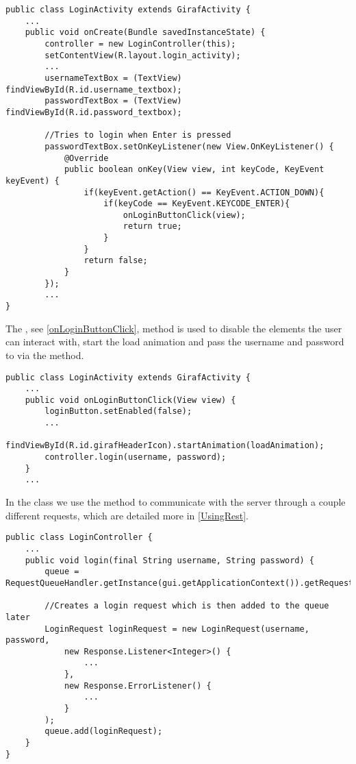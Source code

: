\begin{minipage}[H]{\linewidth}
\begin{lstlisting}[caption = ???, label = onCreate] 
public class LoginActivity extends GirafActivity {
	...
	public void onCreate(Bundle savedInstanceState) {
		controller = new LoginController(this);
    	setContentView(R.layout.login_activity);
		...
        usernameTextBox = (TextView) findViewById(R.id.username_textbox);
        passwordTextBox = (TextView) findViewById(R.id.password_textbox);
        
        //Tries to login when Enter is pressed
        passwordTextBox.setOnKeyListener(new View.OnKeyListener() {
            @Override
            public boolean onKey(View view, int keyCode, KeyEvent keyEvent) {
                if(keyEvent.getAction() == KeyEvent.ACTION_DOWN){
                    if(keyCode == KeyEvent.KEYCODE_ENTER){
                        onLoginButtonClick(view);
                        return true;
                    }
                }
                return false;
            }
        });
        ...
}
\end{lstlisting}
\end{minipage}

The , see \autoref{onLoginButtonClick}, method is used
to disable the elements the user can interact with, start the load animation and
pass the username and password to  via the 
method.\nl

\begin{minipage}[H]{\linewidth}
\begin{lstlisting}[caption = The effects of trying to login , label =
onLoginButtonClick] 
public class LoginActivity extends GirafActivity {
	...
	public void onLoginButtonClick(View view) {
        loginButton.setEnabled(false);
 		...
        findViewById(R.id.girafHeaderIcon).startAnimation(loadAnimation);
        controller.login(username, password);
    }
	...
\end{lstlisting}
\end{minipage}

In the  class we use the  method to
communicate with the server through a couple different requests, which are
detailed more in \autoref{UsingRest}.\\




\begin{minipage}[H]{\linewidth}
\begin{lstlisting}[caption = ???, label = loginReq]
public class LoginController {
	...
    public void login(final String username, String password) {
        queue = RequestQueueHandler.getInstance(gui.getApplicationContext()).getRequestQueue();

        //Creates a login request which is then added to the queue later
        LoginRequest loginRequest = new LoginRequest(username, password,
        	new Response.Listener<Integer>() {
        		...
        	},
        	new Response.ErrorListener() {
        		...
        	}
   		);
		queue.add(loginRequest);
	}
}
\end{lstlisting}
\end{minipage}


